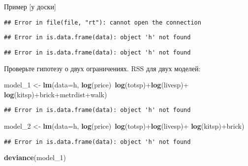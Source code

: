 \documentclass[russian,ignorenonframetext,]{beamer}
\newenvironment{Shaded}{\begin{snugshade}}{\end{snugshade}}
\newcommand{\KeywordTok}[1]{\textcolor[rgb]{0.13,0.29,0.53}{\textbf{{#1}}}}
\newcommand{\DataTypeTok}[1]{\textcolor[rgb]{0.13,0.29,0.53}{{#1}}}
\newcommand{\StringTok}[1]{\textcolor[rgb]{0.31,0.60,0.02}{{#1}}}
\newcommand{\NormalTok}[1]{{#1}}
\begin{document}
\begin{frame}[fragile]{Пример {[}у доски{]}}

\begin{verbatim}
## Error in file(file, "rt"): cannot open the connection
\end{verbatim}

\begin{verbatim}
## Error in is.data.frame(data): object 'h' not found
\end{verbatim}

\begin{verbatim}
## Error in is.data.frame(data): object 'h' not found
\end{verbatim}

Проверьте гипотезу о двух ограничениях. RSS для двух моделей:

\begin{Shaded}
\begin{Highlighting}[]
\NormalTok{model_1 <-}\StringTok{ }\KeywordTok{lm}\NormalTok{(}\DataTypeTok{data=}\NormalTok{h, }\KeywordTok{log}\NormalTok{(price)~}\KeywordTok{log}\NormalTok{(totsp)+}\KeywordTok{log}\NormalTok{(livesp)+}
\StringTok{                }\KeywordTok{log}\NormalTok{(kitsp)+brick+metrdist+walk)}
\end{Highlighting}
\end{Shaded}

\begin{verbatim}
## Error in is.data.frame(data): object 'h' not found
\end{verbatim}

\begin{Shaded}
\begin{Highlighting}[]
\NormalTok{model_2 <-}\StringTok{ }\KeywordTok{lm}\NormalTok{(}\DataTypeTok{data=}\NormalTok{h, }\KeywordTok{log}\NormalTok{(price)~}\KeywordTok{log}\NormalTok{(totsp)+}\KeywordTok{log}\NormalTok{(livesp)+}
\StringTok{                }\KeywordTok{log}\NormalTok{(kitsp)+brick)}
\end{Highlighting}
\end{Shaded}

\begin{verbatim}
## Error in is.data.frame(data): object 'h' not found
\end{verbatim}

\begin{Shaded}
\begin{Highlighting}[]
\KeywordTok{deviance}\NormalTok{(model_1)}
\end{Highlighting}
\end{Shaded}


\end{frame}
\end{document}
